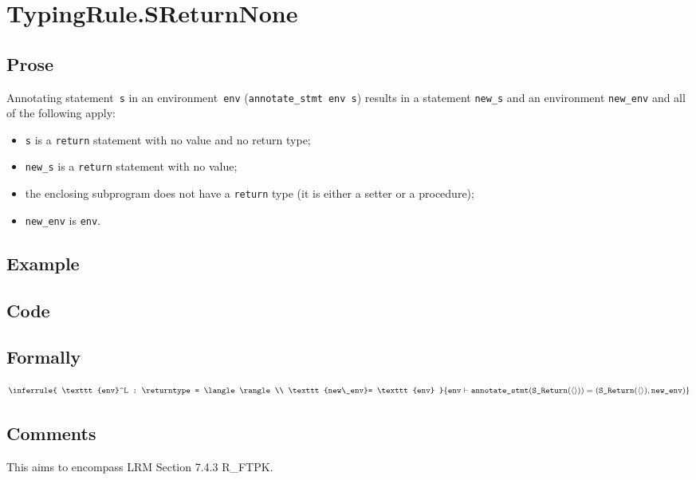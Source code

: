 \documentclass{book}
\newcommand\annotatestmt[1]{\texttt{annotate\_stmt}(#1)}
\newcommand\tenv[0]{\texttt{env}}
\newcommand\newenv[0]{\texttt{new\_env}}
\begin{document}
\section{TypingRule.SReturnNone \label{sec:TypingRule.SReturnNone}}

  \subsection{Prose}
Annotating statement~\texttt{s} in an environment~\texttt{env}
(\texttt{annotate\_stmt env s}) results in a statement \texttt{new\_s} and an
environment \texttt{new\_env} and all of the following apply:
   \begin{itemize}
   \item \texttt{s} is a \texttt{return} statement with no value and no return type; 
   \item \texttt{new\_s} is a \texttt{return} statement with no value;
   \item the enclosing subprogram does not have a \texttt{return} type (it is either a setter
      or a procedure);
   \item \texttt{new\_env} is \texttt{env}.
   \end{itemize}

  \subsection{Example}

  \subsection{Code}

\begin{emptyformal}
    \subsection{Formally}
\[
\inferrule{
  \tenv^L : \returntype = \langle\rangle\\
  \newenv = \tenv
}
{\tenv \entails \annotatestmt{\texttt{S\_Return}(\langle\rangle)} = (\texttt{S\_Return}(\langle\rangle), \newenv)}
\]
\end{emptyformal}

\subsection{Comments}
    This aims to encompass LRM Section 7.4.3 R\_FTPK.
\end{document}
